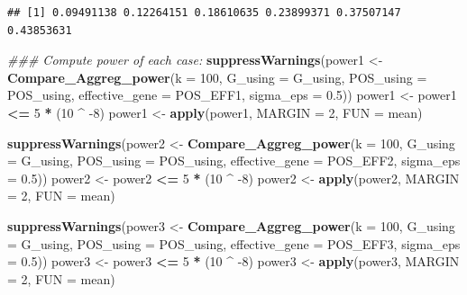 \documentclass[
]{article}
\newenvironment{Shaded}{\begin{snugshade}}{\end{snugshade}}
\newcommand{\CommentTok}[1]{\textcolor[rgb]{0.56,0.35,0.01}{\textit{#1}}}
\newcommand{\DataTypeTok}[1]{\textcolor[rgb]{0.13,0.29,0.53}{#1}}
\newcommand{\DecValTok}[1]{\textcolor[rgb]{0.00,0.00,0.81}{#1}}
\newcommand{\FloatTok}[1]{\textcolor[rgb]{0.00,0.00,0.81}{#1}}
\newcommand{\KeywordTok}[1]{\textcolor[rgb]{0.13,0.29,0.53}{\textbf{#1}}}
\newcommand{\NormalTok}[1]{#1}
\newcommand{\OperatorTok}[1]{\textcolor[rgb]{0.81,0.36,0.00}{\textbf{#1}}}
\newcommand{\StringTok}[1]{\textcolor[rgb]{0.31,0.60,0.02}{#1}}
\begin{document}
\begin{verbatim}
## [1] 0.09491138 0.12264151 0.18610635 0.23899371 0.37507147 0.43853631
\end{verbatim}

\begin{Shaded}
\begin{Highlighting}[]
\CommentTok{### Compute power of each case:}
\KeywordTok{suppressWarnings}\NormalTok{(power1 <-}\StringTok{ }\KeywordTok{Compare_Aggreg_power}\NormalTok{(}\DataTypeTok{k =} \DecValTok{100}\NormalTok{, }\DataTypeTok{G_using =}\NormalTok{ G_using, }\DataTypeTok{POS_using =}\NormalTok{ POS_using, }\DataTypeTok{effective_gene =}\NormalTok{ POS_EFF1, }\DataTypeTok{sigma_eps =} \FloatTok{0.5}\NormalTok{))}
\NormalTok{power1 <-}\StringTok{ }\NormalTok{power1 }\OperatorTok{<=}\StringTok{ }\DecValTok{5} \OperatorTok{*}\StringTok{ }\NormalTok{(}\DecValTok{10} \OperatorTok{^}\StringTok{ }\DecValTok{-8}\NormalTok{)}
\NormalTok{power1 <-}\StringTok{ }\KeywordTok{apply}\NormalTok{(power1, }\DataTypeTok{MARGIN =} \DecValTok{2}\NormalTok{, }\DataTypeTok{FUN =}\NormalTok{ mean)}

\KeywordTok{suppressWarnings}\NormalTok{(power2 <-}\StringTok{ }\KeywordTok{Compare_Aggreg_power}\NormalTok{(}\DataTypeTok{k =} \DecValTok{100}\NormalTok{, }\DataTypeTok{G_using =}\NormalTok{ G_using, }\DataTypeTok{POS_using =}\NormalTok{ POS_using, }\DataTypeTok{effective_gene =}\NormalTok{ POS_EFF2, }\DataTypeTok{sigma_eps =} \FloatTok{0.5}\NormalTok{))}
\NormalTok{power2 <-}\StringTok{ }\NormalTok{power2 }\OperatorTok{<=}\StringTok{ }\DecValTok{5} \OperatorTok{*}\StringTok{ }\NormalTok{(}\DecValTok{10} \OperatorTok{^}\StringTok{ }\DecValTok{-8}\NormalTok{)}
\NormalTok{power2 <-}\StringTok{ }\KeywordTok{apply}\NormalTok{(power2, }\DataTypeTok{MARGIN =} \DecValTok{2}\NormalTok{, }\DataTypeTok{FUN =}\NormalTok{ mean)}

\KeywordTok{suppressWarnings}\NormalTok{(power3 <-}\StringTok{ }\KeywordTok{Compare_Aggreg_power}\NormalTok{(}\DataTypeTok{k =} \DecValTok{100}\NormalTok{, }\DataTypeTok{G_using =}\NormalTok{ G_using, }\DataTypeTok{POS_using =}\NormalTok{ POS_using, }\DataTypeTok{effective_gene =}\NormalTok{ POS_EFF3, }\DataTypeTok{sigma_eps =} \FloatTok{0.5}\NormalTok{))}
\NormalTok{power3 <-}\StringTok{ }\NormalTok{power3 }\OperatorTok{<=}\StringTok{ }\DecValTok{5} \OperatorTok{*}\StringTok{ }\NormalTok{(}\DecValTok{10} \OperatorTok{^}\StringTok{ }\DecValTok{-8}\NormalTok{)}
\NormalTok{power3 <-}\StringTok{ }\KeywordTok{apply}\NormalTok{(power3, }\DataTypeTok{MARGIN =} \DecValTok{2}\NormalTok{, }\DataTypeTok{FUN =}\NormalTok{ mean)}


\end{Highlighting}
\end{Shaded}
\end{document}
